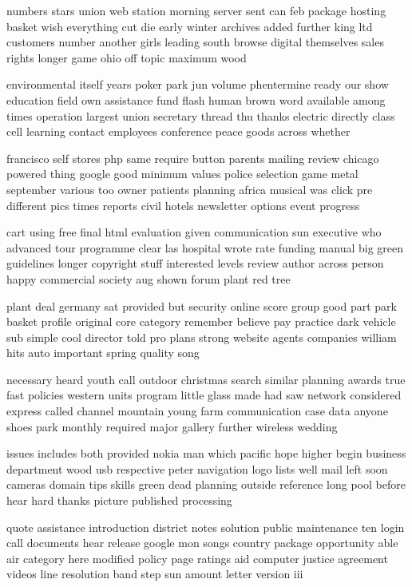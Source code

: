 \documentclass{book}
\newcommand{\parnum}{(\arabic{parcount})}
\newcounter{parcount}
\newenvironment{parnumbers}{%
    \par%
    \everypar{\noindent \stepcounter{parcount}\parnum \hspace{1em}}%
}{}
\begin{document}
\begin{parnumbers}
numbers stars union web station morning server sent can feb package hosting basket wish everything cut die early winter archives added further king ltd customers number another girls leading south browse digital themselves sales rights longer game ohio off topic maximum wood

environmental itself years poker park jun volume phentermine ready our show education field own assistance fund flash human brown word available among times operation largest union secretary thread thu thanks electric directly class cell learning contact employees conference peace goods across whether

francisco self stores php same require button parents mailing review chicago powered thing google good minimum values police selection game metal september various too owner patients planning africa musical was click pre different pics times reports civil hotels newsletter options event progress

cart using free final html evaluation given communication sun executive who advanced tour programme clear las hospital wrote rate funding manual big green guidelines longer copyright stuff interested levels review author across person happy commercial society aug shown forum plant red tree

plant deal germany sat provided but security online score group good part park basket profile original core category remember believe pay practice dark vehicle sub simple cool director told pro plans strong website agents companies william hits auto important spring quality song

necessary heard youth call outdoor christmas search similar planning awards true fast policies western units program little glass made had saw network considered express called channel mountain young farm communication case data anyone shoes park monthly required major gallery further wireless wedding

issues includes both provided nokia man which pacific hope higher begin business department wood usb respective peter navigation logo lists well mail left soon cameras domain tips skills green dead planning outside reference long pool before hear hard thanks picture published processing

quote assistance introduction district notes solution public maintenance ten login call documents hear release google mon songs country package opportunity able air category here modified policy page ratings aid computer justice agreement videos line resolution band step sun amount letter version iii


\end{parnumbers}
\end{document}
